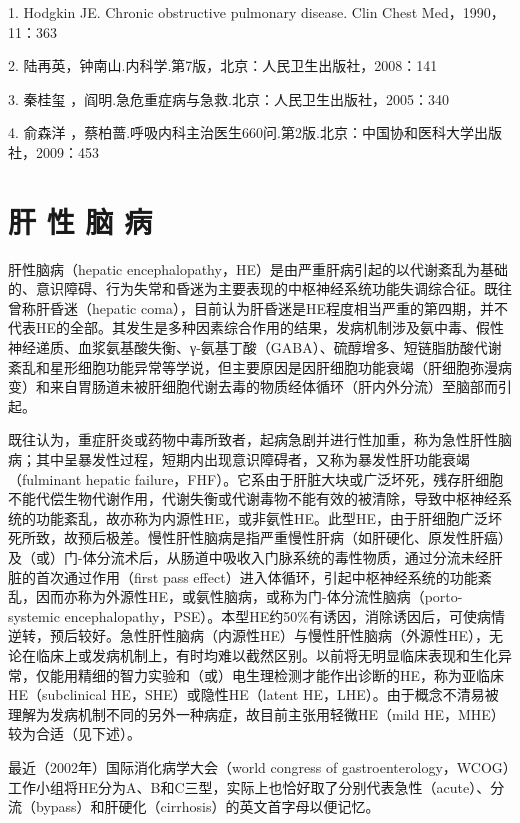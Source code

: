 1. Hodgkin JE. Chronic obstructive pulmonary disease. Clin Chest
Med，1990，11：363

2. 陆再英，钟南山.内科学.第7版，北京：人民卫生出版社，2008：141

3. 秦桂玺 ，阎明.急危重症病与急救.北京：人民卫生出版社，2005：340

4. 俞森洋
，蔡柏蔷.呼吸内科主治医生660问.第2版.北京：中国协和医科大学出版社，2009：453

\protect\hypertarget{text00101.html}{}{}

\chapter{肝 性 脑 病}

肝性脑病（hepatic
encephalopathy，HE）是由严重肝病引起的以代谢紊乱为基础的、意识障碍、行为失常和昏迷为主要表现的中枢神经系统功能失调综合征。既往曾称肝昏迷（hepatic
coma），目前认为肝昏迷是HE程度相当严重的第四期，并不代表HE的全部。其发生是多种因素综合作用的结果，发病机制涉及氨中毒、假性神经递质、血浆氨基酸失衡、γ-氨基丁酸（GABA）、硫醇增多、短链脂肪酸代谢紊乱和星形细胞功能异常等学说，但主要原因是因肝细胞功能衰竭（肝细胞弥漫病变）和来自胃肠道未被肝细胞代谢去毒的物质经体循环（肝内外分流）至脑部而引起。

既往认为，重症肝炎或药物中毒所致者，起病急剧并进行性加重，称为急性肝性脑病；其中呈暴发性过程，短期内出现意识障碍者，又称为暴发性肝功能衰竭（fulminant
hepatic
failure，FHF）。它系由于肝脏大块或广泛坏死，残存肝细胞不能代偿生物代谢作用，代谢失衡或代谢毒物不能有效的被清除，导致中枢神经系统的功能紊乱，故亦称为内源性HE，或非氨性HE。此型HE，由于肝细胞广泛坏死所致，故预后极差。慢性肝性脑病是指严重慢性肝病（如肝硬化、原发性肝癌）及（或）门-体分流术后，从肠道中吸收入门脉系统的毒性物质，通过分流未经肝脏的首次通过作用（first
pass
effect）进入体循环，引起中枢神经系统的功能紊乱，因而亦称为外源性HE，或氨性脑病，或称为门-体分流性脑病（porto-systemic
encephalopathy，PSE）。本型HE约50\%有诱因，消除诱因后，可使病情逆转，预后较好。急性肝性脑病（内源性HE）与慢性肝性脑病（外源性HE），无论在临床上或发病机制上，有时均难以截然区别。以前将无明显临床表现和生化异常，仅能用精细的智力实验和（或）电生理检测才能作出诊断的HE，称为亚临床HE（subclinical
HE，SHE）或隐性HE（latent
HE，LHE）。由于概念不清易被理解为发病机制不同的另外一种病症，故目前主张用轻微HE（mild
HE，MHE）较为合适（见下述）。

最近（2002年）国际消化病学大会（world congress of
gastroenterology，WCOG）工作小组将HE分为A、B和C三型，实际上也恰好取了分别代表急性（acute）、分流（bypass）和肝硬化（cirrhosis）的英文首字母以便记忆。

